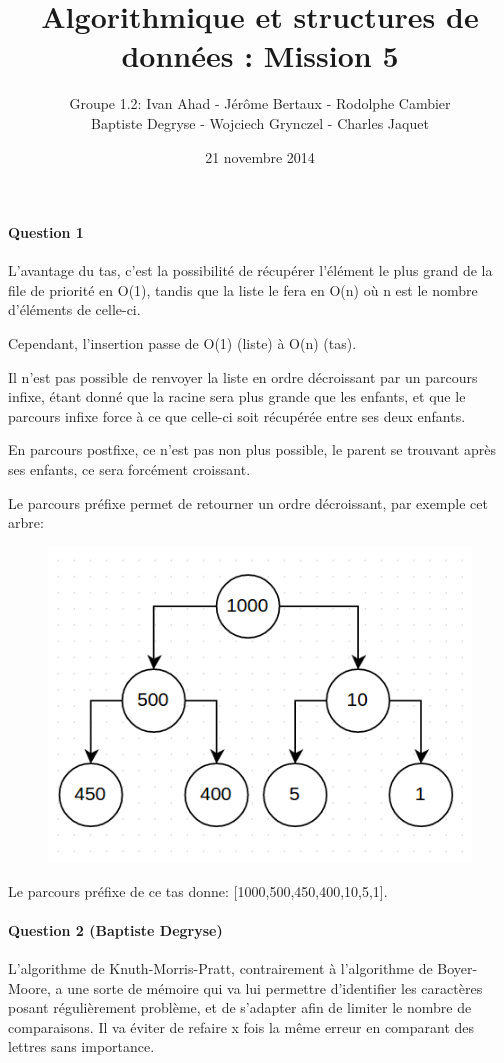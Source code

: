 \documentclass[a4paper]{article}
\title{Algorithmique et structures de données : Mission 5}
\date{21 novembre 2014}
\author{Groupe 1.2: Ivan Ahad - Jérôme Bertaux - Rodolphe Cambier \\ 
	Baptiste Degryse - Wojciech Grynczel - Charles Jaquet}
\begin{document}
\maketitle

\paragraph*{Question 1}
L'avantage du tas, c'est la possibilité de récupérer l'élément le plus grand de la file de priorité en O(1), tandis que la liste le fera en O(n) où n est le nombre d'éléments de celle-ci.

Cependant, l'insertion passe de O(1) (liste) à O(n) (tas).

Il n'est pas possible de renvoyer la liste en ordre décroissant par un parcours infixe, étant donné que la racine sera plus grande que les enfants, et que le parcours infixe force à ce que celle-ci soit récupérée entre ses deux enfants.

En parcours postfixe, ce n'est pas non plus possible, le parent se trouvant après ses enfants, ce sera forcément croissant.

Le parcours préfixe permet de retourner un ordre décroissant, par exemple cet arbre:

\begin{figure}[H]
\centering
\includegraphics[scale=0.5]{tree.png}
\end{figure} 

Le parcours préfixe de ce tas donne: [1000,500,450,400,10,5,1].

 
\paragraph*{Question 2 (Baptiste Degryse)}
L'algorithme de Knuth-Morris-Pratt, contrairement à l'algorithme de Boyer-Moore, a une sorte de mémoire qui va lui permettre d'identifier les caractères posant régulièrement problème, et de s'adapter afin de limiter le nombre de comparaisons. Il va éviter de refaire x fois la même erreur en comparant des lettres sans importance.\\
\end{document}
